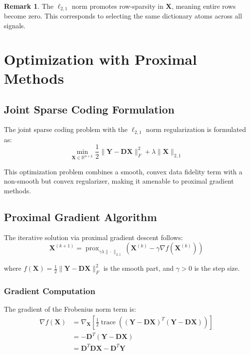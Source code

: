 \documentclass[12pt]{article}
\renewcommand{\vec}[1]{\mathbf{#1}}
\DeclareMathOperator{\prox}{prox}
\DeclareMathOperator{\trace}{trace}
\theoremstyle{definition}
\newtheorem{remark}{Remark}[section]
\begin{document}
\begin{remark}
    The $\ell_{2,1}$ norm promotes row-sparsity in $\vec{X}$, meaning entire rows become zero. This corresponds to selecting the same dictionary atoms across all signals.
\end{remark}

\newpage

\section{Optimization with Proximal Methods}

\subsection{Joint Sparse Coding Formulation}

The joint sparse coding problem with the $\ell_{2,1}$ norm regularization is formulated as:
\begin{equation}
    \min_{\vec{X} \in \mathbb{R}^{n \times L}} \frac{1}{2}\|\vec{Y} - \vec{D}\vec{X}\|_F^2 + \lambda\|\vec{X}\|_{2,1}
    \label{eq:joint_sparse_opt}
\end{equation}

This optimization problem combines a smooth, convex data fidelity term with a non-smooth but convex regularizer, making it amenable to proximal gradient methods.

\subsection{Proximal Gradient Algorithm}

The iterative solution via proximal gradient descent follows:
\begin{equation}
    \vec{X}^{(k+1)} = \prox_{\gamma\lambda\|\cdot\|_{2,1}}\left(\vec{X}^{(k)} - \gamma\nabla f(\vec{X}^{(k)})\right)
    \label{eq:prox_grad_update}
\end{equation}

where $f(\vec{X}) = \frac{1}{2}\|\vec{Y} - \vec{D}\vec{X}\|_F^2$ is the smooth part, and $\gamma > 0$ is the step size.

\subsubsection{Gradient Computation}

The gradient of the Frobenius norm term is:
\begin{align}
    \nabla f(\vec{X}) & = \nabla_{\vec{X}}\left[\frac{1}{2}\trace\left((\vec{Y} - \vec{D}\vec{X})^T(\vec{Y} - \vec{D}\vec{X})\right)\right] \\
                      & = -\vec{D}^T(\vec{Y} - \vec{D}\vec{X})                                                                              \\
                      & = \vec{D}^T\vec{D}\vec{X} - \vec{D}^T\vec{Y}
    \label{eq:gradient_computation}
\end{align}
\end{document}

